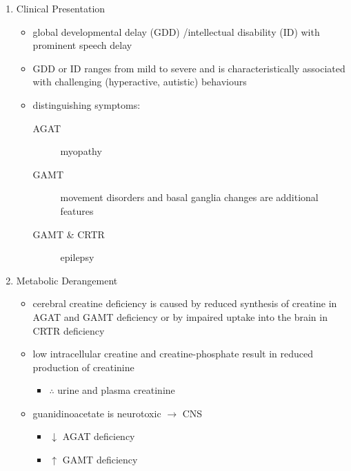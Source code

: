 \documentclass{scrartcl}
\begin{document}
\begin{enumerate}
\item Clinical Presentation
\label{sec:orge562c16}
\begin{itemize}
\item global developmental delay (GDD) /intellectual disability (ID) with
prominent speech delay
\item GDD or ID ranges from mild to severe and is characteristically
associated with challenging (hyperactive, autistic) behaviours
\item distinguishing symptoms:
\begin{description}
\item[{AGAT}] myopathy
\item[{GAMT}] movement disorders and basal ganglia changes are
additional features
\item[{GAMT \& CRTR}] epilepsy
\end{description}
\end{itemize}

\item Metabolic Derangement
\label{sec:org0160ce8}
\begin{itemize}
\item cerebral creatine deficiency is caused by reduced synthesis of
creatine in AGAT and GAMT deficiency or by impaired uptake into the
brain in CRTR deficiency
\item low intracellular creatine and creatine-phosphate result in reduced
production of creatinine
\begin{itemize}
\item \(\therefore\) \low urine and plasma creatinine
\end{itemize}
\item guanidinoacetate is neurotoxic \(\to\) CNS
\begin{itemize}
\item \(\downarrow\) AGAT deficiency
\item \(\uparrow\) GAMT deficiency
\end{itemize}
\end{itemize}


\end{enumerate}
\end{document}
